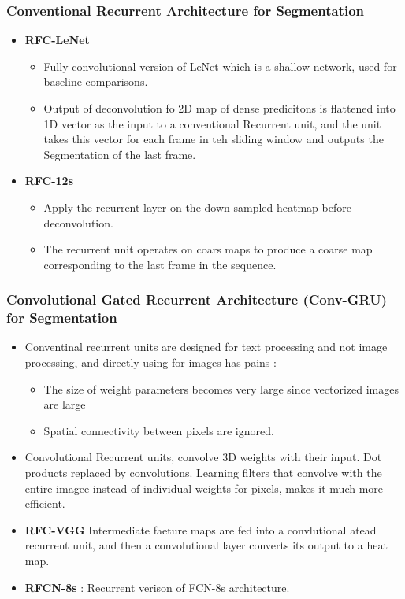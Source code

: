 \documentclass{article}
\begin{document}
\subsubsection{Conventional Recurrent Architecture for Segmentation}
\begin{itemize}
\item \textbf{RFC-LeNet}
  \begin{itemize}               %
  \item Fully convolutional version of LeNet which is a shallow network, used for baseline comparisons.
  \item Output of deconvolution fo 2D map of dense predicitons is flattened into 1D vector as the input to a conventional Recurrent unit, and the unit takes this vector for each frame in teh sliding window and outputs the Segmentation of the last frame.
  \end{itemize}
\item \textbf{RFC-12s}
  \begin{itemize}
  \item Apply the recurrent layer on the down-sampled heatmap before deconvolution.
  \item The recurrent unit operates on coars maps to produce a coarse map corresponding to the last frame in the sequence.
  \end{itemize}
\end{itemize}

\subsubsection{Convolutional Gated Recurrent Architecture (Conv-GRU) for Segmentation}
\begin{itemize}
\item Conventinal recurrent units are designed for text processing and not image processing, and directly using for images has pains :
  \begin{itemize}
  \item The size of weight parameters becomes very large since vectorized images are large
  \item Spatial connectivity between pixels are ignored.
  \end{itemize}
\item Convolutional Recurrent units, convolve 3D weights with their input. Dot products replaced by convolutions. Learning filters that convolve with the entire imagee instead of individual weights for pixels, makes it much more efficient.
\item \textbf{RFC-VGG}
    Intermediate faeture maps are fed into a convlutional atead recurrent unit, and then a convolutional layer converts its output to a heat map.
\item \textbf{RFCN-8s} : Recurrent verison of FCN-8s architecture.
\end{itemize}




\end{document}
